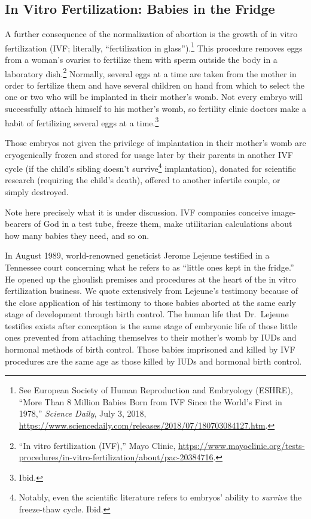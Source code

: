 \documentclass[
]{book}
\begin{document}
\hypertarget{in-vitro-fertilization-babies-in-the-fridge}{%
\subsection{In Vitro Fertilization: Babies in the Fridge}\label{in-vitro-fertilization-babies-in-the-fridge}}

A further consequence of the normalization of abortion is the growth of in vitro fertilization (IVF; literally, ``fertilization in glass'').\footnote{See European Society of Human Reproduction and Embryology (ESHRE), ``More Than 8 Million Babies Born from IVF Since the World's First in 1978,'' \emph{Science Daily}, July 3, 2018, \url{https://www.sciencedaily.com/releases/2018/07/180703084127.htm}.} This procedure removes eggs from a woman's ovaries to fertilize them with sperm outside the body in a laboratory dish.\footnote{``In vitro fertilization (IVF),'' Mayo Clinic, \url{https://www.mayoclinic.org/tests-procedures/in-vitro-fertilization/about/pac-20384716}.} Normally, several eggs at a time are taken from the mother in order to fertilize them and have several children on hand from which to select the one or two who will be implanted in their mother's womb. Not every embryo will successfully attach himself to his mother's womb, so fertility clinic doctors make a habit of fertilizing several eggs at a time.\footnote{Ibid.}

Those embryos not given the privilege of implantation in their mother's womb are cryogenically frozen and stored for usage later by their parents in another IVF cycle (if the child's sibling doesn't survive\footnote{Notably, even the scientific literature refers to embryos' ability to \emph{survive} the freeze-thaw cycle. Ibid.} implantation), donated for scientific research (requiring the child's death), offered to another infertile couple, or simply destroyed.

Note here precisely what it is under discussion. IVF companies conceive image-bearers of God in a test tube, freeze them, make utilitarian calculations about how many babies they need, and so on.

In August 1989, world-renowned geneticist Jerome Lejeune testified in a Tennessee court concerning what he refers to as ``little ones kept in the fridge.'' He opened up the ghoulish premises and procedures at the heart of the in vitro fertilization business. We quote extensively from Lejeune's testimony because of the close application of his testimony to those babies aborted at the same early stage of development through birth control. The human life that Dr.~Lejeune testifies exists after conception is the same stage of embryonic life of those little ones prevented from attaching themselves to their mother's womb by IUDs and hormonal methods of birth control. Those babies imprisoned and killed by IVF procedures are the same age as those killed by IUDs and hormonal birth control.
\end{document}
